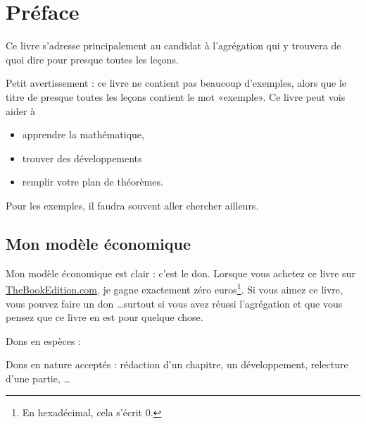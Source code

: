 
\section*{Préface}

Ce livre s'adresse principalement au candidat à l'agrégation qui y trouvera de quoi dire pour presque toutes les leçons.

Petit avertissement : ce livre ne contient pas beaucoup d'exemples, alors que le titre de presque toutes les leçons contient le mot «exemple». Ce livre peut vois aider à
\begin{itemize}
    \item apprendre la mathématique,
    \item trouver des développements
    \item remplir votre plan de théorèmes.
\end{itemize}
Pour les exemples, il faudra souvent aller chercher ailleurs.

\subsection*{Mon modèle économique}

Mon modèle économique est clair : c'est le don. Lorsque vous achetez ce livre sur \href{http://www.thebookedition.com/fr/}{TheBookEdition.com}, je gagne exactement zéro euros\footnote{En hexadécimal, cela s'écrit \( 0\).}. Si vous aimez ce livre, vous pouvez faire un don \ldots surtout si vous avez réussi l'agrégation et que vous pensez que ce livre en est pour quelque chose.


Dons en espèces :


Dons en nature acceptés : rédaction d'un chapitre, un développement, relecture d'une partie, \ldots
